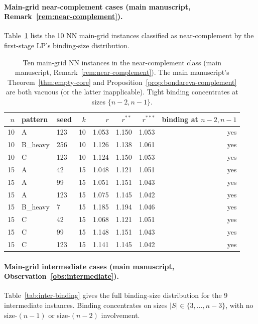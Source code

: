 \documentclass[11pt]{article}
\theoremstyle{plain}
\theoremstyle{definition}
\theoremstyle{remark}
\begin{document}
\paragraph{Main-grid near-complement cases (main manuscript, Remark~\ref{rem:near-complement}).} Table~\ref{tab:near-main} lists the 10 NN main-grid instances classified as near-complement by the first-stage LP's binding-size distribution.

\begin{table}[htbp]
\centering
\footnotesize
\caption{Ten main-grid NN instances in the near-complement class (main manuscript, Remark~\ref{rem:near-complement}). The main manuscript's Theorem~\ref{thm:empty-core} and Proposition~\ref{prop:bondareva-complement} are both vacuous (or the latter inapplicable). Tight binding concentrates at sizes $\{n-2, n-1\}$.}
\label{tab:near-main}
\begin{tabular}{@{}rllrrrrr@{}}
\toprule
$n$ & pattern & seed & $k$ & $r$ & $r^{\ast\ast}$ & $r^{\ast\ast\ast}$ & binding at $n-2, n-1$ \\
\midrule
10 & A        & 123 & 10 & 1.053 & 1.150 & 1.053 & yes \\
10 & B\_heavy & 256 & 10 & 1.126 & 1.138 & 1.061 & yes \\
10 & C        & 123 & 10 & 1.124 & 1.150 & 1.053 & yes \\
15 & A        &  42 & 15 & 1.048 & 1.121 & 1.051 & yes \\
15 & A        &  99 & 15 & 1.051 & 1.151 & 1.043 & yes \\
15 & A        & 123 & 15 & 1.075 & 1.145 & 1.042 & yes \\
15 & B\_heavy &   7 & 15 & 1.185 & 1.194 & 1.046 & yes \\
15 & C        &  42 & 15 & 1.068 & 1.121 & 1.051 & yes \\
15 & C        &  99 & 15 & 1.148 & 1.151 & 1.043 & yes \\
15 & C        & 123 & 15 & 1.141 & 1.145 & 1.042 & yes \\
\bottomrule
\end{tabular}
\end{table}

\paragraph{Main-grid intermediate cases (main manuscript, Observation~\ref{obs:intermediate}).} Table~\ref{tab:inter-binding} gives the full binding-size distribution for the 9 intermediate instances. Binding concentrates on sizes $|S|\in\{3,\ldots,n-3\}$, with no size-$(n-1)$ or size-$(n-2)$ involvement.
\end{document}
